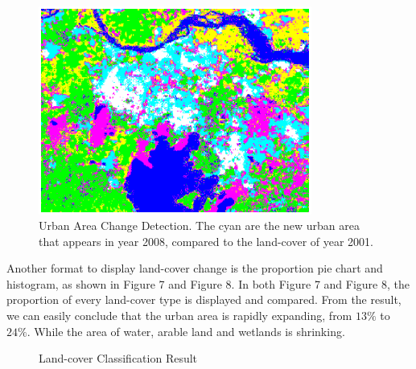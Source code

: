 \documentclass{elsart}
\begin{document}
\begin{figure}[H]
\begin{center}
\includegraphics[width=0.8\textwidth]{dr.eps}
\caption{Urban Area Change Detection. The cyan are the new urban area that appears in year 2008, compared to the land-cover of year 2001.}
\label{method}
\end{center}
\end{figure}
\par

Another format to display land-cover change is the proportion pie chart and histogram, as shown in Figure 7 and Figure 8.
In both Figure 7 and Figure 8, the proportion of every land-cover type is displayed and compared.
From the result, we can easily conclude that the urban area is rapidly expanding, from $13\%$ to $24\%$.
While the area of water, arable land and wetlands is shrinking.
\par
\begin{figure}[H]
\centering
{}
\caption{Land-cover Classification Result}
\label{Fig.lable}
\end{figure}
\end{document}
